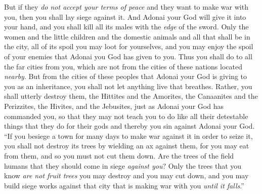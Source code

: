 \begin{biblechapter}
\verse But if they \textit{do not accept your terms of peace} and they want to make war with you, then you shall lay siege against it.
\verse And Adonai your God will give it into your hand, and you shall kill all its males with the \textit{edge} of the sword.
\verse Only the women and the little children and the domestic animals and all that shall be in the city, all of its spoil you may loot for yourselves, and you may enjoy the spoil of your enemies that Adonai you God has given to you.
\verse Thus you shall do to all the far cities from you, which are not from the cities of these nations located \textit{nearby}.
\verse But from the cities of these peoples that Adonai your God is giving to you as an inheritance, you shall not let anything live that breathes.
\verse Rather, you shall utterly destroy them, the Hittites and the Amorites, the Canaanites and the Perizzites, the Hivites, and the Jebusites, just as Adonai your God has commanded you,
\verse so that they may not teach you to do like all their detestable things that they do for their gods and thereby you sin against Adonai your God.
\verse “If you besiege a town for many days to make war against it in order to seize it, you shall not destroy its trees by wielding an ax against them, for you may eat from them, and so you must not cut them down. Are the trees of the field humans that they should come in siege \textit{against you}?
\verse Only the trees that you know \textit{are not fruit trees} you may destroy and you may cut down, and you may build siege works against that city that is making war with you \textit{until it falls}.”
\end{biblechapter}

